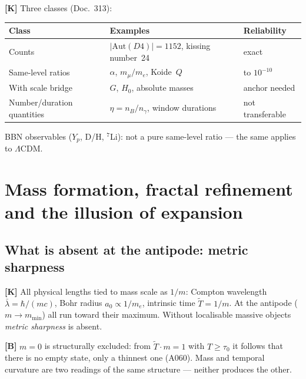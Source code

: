 \textbf{[K]} Three classes (Doc.~313):

\begin{center}
\small
\begin{tabular}{p{3.2cm}p{4cm}p{3cm}}
\toprule
Class & Examples & Reliability \\
\midrule
Counts & $|\text{Aut}(D4)| = 1152$, kissing number~24 & exact \\
Same-level ratios & $\alpha$, $m_\mu/m_e$, Koide~$Q$ &
  to $10^{-10}$ \\
With scale bridge & $G$, $H_0$, absolute masses & anchor needed \\
Number/duration quantities & $\eta = n_B/n_\gamma$, window durations &
  not transferable \\
\bottomrule
\end{tabular}
\end{center}

BBN observables ($Y_p$, D/H, ${}^7$Li): not a pure same-level ratio ---
the same applies to $\Lambda$CDM.

\section{Mass formation, fractal refinement and the illusion of expansion}

\subsection{What is absent at the antipode: metric sharpness}

\textbf{[K]} All physical lengths tied to mass scale as $1/m$:
Compton wavelength $\bar\lambda = \hbar/(mc)$,
Bohr radius $a_0 \propto 1/m_e$, intrinsic time $\tilde{T} = 1/m$.
At the antipode ($m \to m_\text{min}$) all run toward their maximum.
Without localisable massive objects \emph{metric sharpness} is absent.

\textbf{[B]} $m = 0$ is structurally excluded: from
$\tilde{T} \cdot m = 1$ with $T \ge \tau_0$ it follows that there is no
empty state, only a thinnest one (A060). Mass and temporal curvature are two
readings of the same structure --- neither produces the other.

